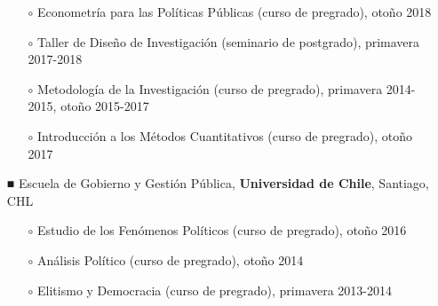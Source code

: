 \begin{publications}
\begin{itemize}
\begin{itemize}
\item[$\circ$]{\small Econometría para las Políticas Públicas (curso de pregrado), otoño 2018}
\item[$\circ$]{\small Taller de Diseño de Investigación (seminario de postgrado), primavera 2017-2018}
\item[$\circ$]{\small Metodología de la Investigación (curso de pregrado), primavera 2014-2015, otoño 2015-2017}
\item[$\circ$]{\small Introducción a los Métodos Cuantitativos (curso de pregrado), otoño 2017}
\end{itemize}
\item[{\scriptsize ■}]{\small Escuela de Gobierno y Gestión Pública, {\bfseries Universidad de Chile}, Santiago, CHL}
\begin{itemize}
\item[$\circ$]{\small Estudio de los Fenómenos Políticos (curso de pregrado), otoño 2016}
\item[$\circ$]{\small Análisis Político (curso de pregrado), otoño 2014}
\item[$\circ$]{\small Elitismo y Democracia (curso de pregrado), primavera 2013-2014}
\end{itemize}
\end{itemize}

\vspace{1mm}
\end{publications}
 
